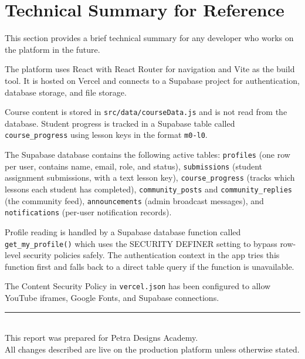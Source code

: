 \documentclass[12pt, a4paper]{article}
\begin{document}
\section{Technical Summary for Reference}

This section provides a brief technical summary for any developer who works on the platform in the future.

The platform uses React with React Router for navigation and Vite as the build tool. It is hosted on Vercel and connects to a Supabase project for authentication, database storage, and file storage.

Course content is stored in \texttt{src/data/courseData.js} and is not read from the database. Student progress is tracked in a Supabase table called \texttt{course\_progress} using lesson keys in the format \texttt{m0-l0}.

The Supabase database contains the following active tables: \texttt{profiles} (one row per user, contains name, email, role, and status), \texttt{submissions} (student assignment submissions, with a text lesson key), \texttt{course\_progress} (tracks which lessons each student has completed), \texttt{community\_posts} and \texttt{community\_replies} (the community feed), \texttt{announcements} (admin broadcast messages), and \texttt{notifications} (per-user notification records).

Profile reading is handled by a Supabase database function called \texttt{get\_my\_profile()} which uses the SECURITY DEFINER setting to bypass row-level security policies safely. The authentication context in the app tries this function first and falls back to a direct table query if the function is unavailable.

The Content Security Policy in \texttt{vercel.json} has been configured to allow YouTube iframes, Google Fonts, and Supabase connections.

\vspace{2cm}
\begin{center}
\rule{10cm}{0.4pt}\\
\vspace{0.4cm}
{\small\color{darkgray}
This report was prepared for Petra Designs Academy.\\
All changes described are live on the production platform unless otherwise stated.
}
\end{center}
\end{document}
